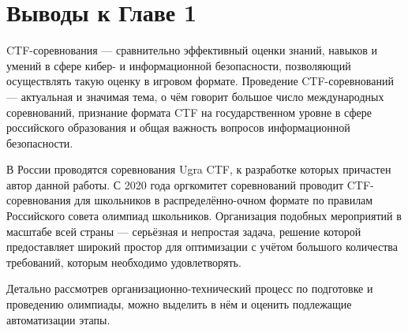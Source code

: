 \chapter*{Выводы к Главе 1}

CTF-соревнования — сравнительно эффективный оценки знаний, навыков и умений в сфере кибер- и информационной безопасности, позволяющий осуществлять такую оценку в игровом формате. Проведение CTF-соревнований — актуальная и значимая тема, о чём говорит большое число международных соревнований, признание формата CTF на государственном уровне в сфере российского образования и общая важность вопросов информационной безопасности.

В России проводятся соревнования Ugra CTF, к разработке которых причастен автор данной работы. С 2020 года оргкомитет соревнований проводит CTF-соревнования для школьников в распределённо-очном формате по правилам Российского совета олимпиад школьников. Организация подобных мероприятий в масштабе всей страны — серьёзная и непростая задача, решение которой предоставляет широкий простор для оптимизации с учётом большого количества требований, которым необходимо удовлетворять.

Детально рассмотрев организационно-технический процесс по подготовке и проведению олимпиады, можно выделить в нём и оценить подлежащие автоматизации этапы.



